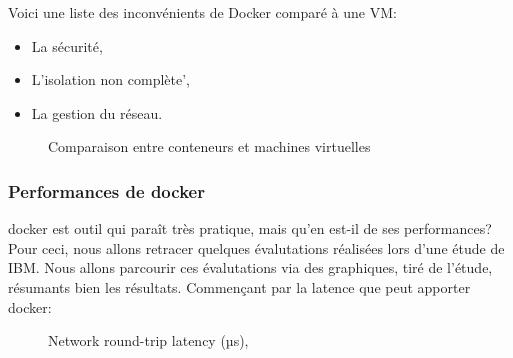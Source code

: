\documentclass[
    iai, %
    il, %
]{heig-tb}
\begin{document}
Voici une liste des inconvénients de Docker comparé à une VM:
\begin{itemize}
    \item La sécurité, \cite{koukia}
    \item L'isolation non complète', \cite{koukia}
    \item La gestion du réseau. \cite{koukia}
\end{itemize}


\begin{figure}
    \caption{Comparaison entre conteneurs et machines virtuelles}
\end{figure}




\subsubsection{Performances de \Gls{docker}}
\Gls{docker} est outil qui paraît très pratique, mais qu'en est-il de ses performances?
Pour ceci, nous allons retracer quelques évalutations réalisées lors d'une étude de IBM. Nous allons parcourir ces évalutations via des graphiques, tiré de l'étude, résumants bien les résultats.
Commençant par la latence que peut apporter \Gls{docker}:
\begin{figure}
    \caption{Network round-trip latency (µs), \cite{rad2017introduction}}
\end{figure}
\end{document}
